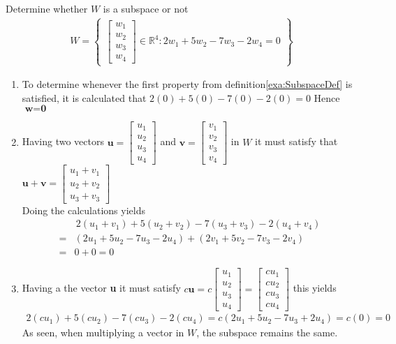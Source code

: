 \begin{example}{Determine whether $W$ is a subspace or not}
\begin{align*}
    W = \begin{Bmatrix}
    \begin{bmatrix}
    w_1\\w_2\\w_3\\w_4
    \end{bmatrix}
        \in \mathbb{R}^4: 2w_1 + 5w_2 - 7w_3 -2w_4 = 0 
    \end{Bmatrix}
\end{align*}
\begin{enumerate}
    \item To determine whenever the first property from definition\ref{exa:SubspaceDef} is satisfied, it is calculated that
    $2(0) + 5(0) - 7(0) -2(0) = 0 $ Hence $\textbf{w}=\textbf{0}$
    \item Having two vectors $\textbf{u}=\begin{bmatrix}
    u_1\\u_2\\u_3\\u_4\end{bmatrix}$ and $\textbf{v}=\begin{bmatrix}
    v_1\\v_2\\v_3\\v_4\end{bmatrix}$ in $W$ it must satisfy that $\textbf{u}+\textbf{v} = \begin{bmatrix}
    u_1 + v_1 \\ u_2 + v_2 \\ u_3 + v_3
    \end{bmatrix}$\\
    Doing the calculations yields
    \begin{align*}
        &\,2(u_1+v_1)+5(u_2+v_2)-7(u_3+v_3)-2(u_4+v_4)\\
        =& (2u_1+5u_2-7u_3-2u_4)+(2v_1+5v_2-7v_3-2v_4)\\ =& 0 + 0 = 0
    \end{align*}
    \item Having a the vector \textbf{u} it must satisfy $c\textbf{u}=c\begin{bmatrix}
    u_1\\u_2\\u_3\\u_4\end{bmatrix}=
    \begin{bmatrix}
    cu_1\\cu_2\\cu_3\\cu_4\end{bmatrix}$ this yields
    \begin{align*}
       2(cu_1)+5(cu_2)-7(cu_3)-2(cu_4)=c(2u_1+5u_2-7u_3+2u_4)= c(0) = 0
    \end{align*}
    As seen, when multiplying a vector in $W$, the subspace remains the same. \\
   
    
\end{enumerate}
\end{example}

